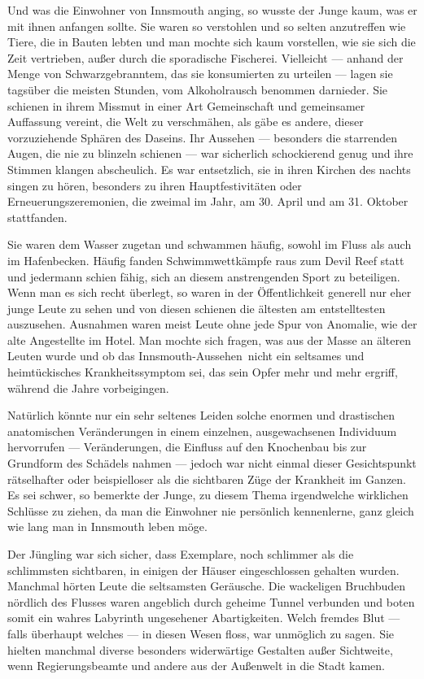 Und was die Einwohner von Innsmouth anging, so wusste der Junge kaum, was er mit ihnen anfangen sollte. Sie waren so verstohlen und so selten anzutreffen wie Tiere, die in Bauten lebten und man mochte sich kaum vorstellen, wie sie sich die Zeit vertrieben, außer durch die sporadische Fischerei. Vielleicht --- anhand der Menge von Schwarzgebranntem, das sie konsumierten zu urteilen --- lagen sie tagsüber die meisten Stunden, vom Alkoholrausch benommen darnieder. Sie schienen in ihrem Missmut in einer Art Gemeinschaft und gemeinsamer Auffassung vereint, die Welt zu verschmähen, als gäbe es andere, dieser vorzuziehende Sphären des Daseins. Ihr Aussehen --- besonders die starrenden Augen, die nie zu blinzeln schienen --- war sicherlich schockierend genug und ihre Stimmen klangen abscheulich. Es war entsetzlich, sie in ihren Kirchen des nachts singen zu hören, besonders zu ihren Hauptfestivitäten oder Erneuerungszeremonien, die zweimal im Jahr, am 30. April und am 31. Oktober stattfanden.

Sie waren dem Wasser zugetan und schwammen häufig, sowohl im Fluss als auch im Hafenbecken. Häufig fanden Schwimmwettkämpfe raus zum Devil Reef statt und jedermann schien fähig, sich an diesem anstrengenden Sport zu beteiligen. Wenn man es sich recht überlegt, so waren in der Öffentlichkeit generell nur eher junge Leute zu sehen und von diesen schienen die ältesten am entstelltesten auszusehen. Ausnahmen waren meist Leute ohne jede Spur von Anomalie, wie der alte Angestellte im Hotel. Man mochte sich fragen, was aus der Masse an älteren Leuten wurde und ob das \glqq Innsmouth-Aussehen\grqq\ nicht ein seltsames und heimtückisches Krankheitssymptom sei, das sein Opfer mehr und mehr ergriff, während die Jahre vorbeigingen.

Natürlich könnte nur ein sehr seltenes Leiden solche enormen und drastischen anatomischen Veränderungen in einem einzelnen, ausgewachsenen Individuum hervorrufen --- Veränderungen, die Einfluss auf den Knochenbau bis zur Grundform des Schädels nahmen --- jedoch war nicht einmal dieser Gesichtspunkt rätselhafter oder beispielloser als die sichtbaren Züge der Krankheit im Ganzen. Es sei schwer, so bemerkte der Junge, zu diesem Thema irgendwelche wirklichen Schlüsse zu ziehen, da man die Einwohner nie persönlich kennenlerne, ganz gleich wie lang man in Innsmouth leben möge.

Der Jüngling war sich sicher, dass Exemplare, noch schlimmer als die schlimmsten sichtbaren, in einigen der  Häuser eingeschlossen gehalten wurden. Manchmal hörten Leute die seltsamsten Geräusche. Die wackeligen  Bruchbuden nördlich des Flusses waren angeblich durch geheime Tunnel verbunden und boten somit ein wahres Labyrinth ungesehener Abartigkeiten. Welch fremdes Blut --- falls überhaupt welches --- in diesen Wesen floss, war unmöglich zu sagen. Sie hielten manchmal diverse besonders widerwärtige Gestalten außer Sichtweite, wenn Regierungsbeamte und andere aus der Außenwelt in die Stadt kamen.


